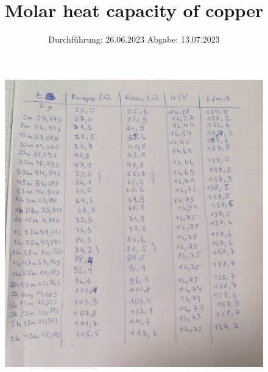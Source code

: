 

\subject{V47}
\title{Molar heat capacity of copper}
\date{
  Durchführung: 26.06.2023
  \hspace{3em}
  Abgabe: 13.07.2023
}
\usepackage[aux]{rerunfilecheck}

\usepackage{fontspec}
\usepackage{siunitx}

\usepackage[ngerman]{babel}

\usepackage[unicode]{hyperref}
\usepackage{bookmark}
\usepackage{booktabs}
\usepackage{import}
\usepackage{amsmath}

\usepackage{scrhack}

\usepackage[aux]{rerunfilecheck}

\usepackage{fontspec}


\usepackage{amsmath}
\usepackage{amssymb}
\usepackage{mathtools}

\usepackage{booktabs}

\usepackage[unicode]{hyperref}
\usepackage{bookmark}
\usepackage{svg}



\maketitle
\thispagestyle{empty}
\tableofcontents
\newpage








\nocite{*}
\printbibliography

\newpage
{}

\begin{figure}[h]
  \centering
  \includegraphics[scale=0.6]{V47_datas.pdf}
  \label{fig:datas}
\end{figure}




